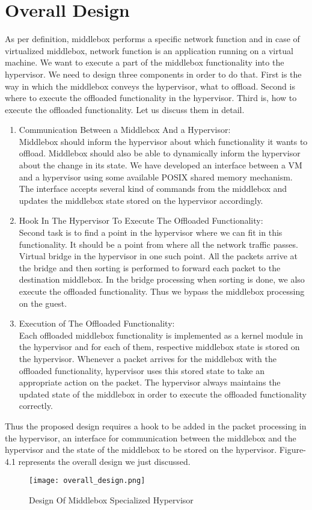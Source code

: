 \documentclass[a4paper,11pt]{report}
\begin{document}
\section{Overall Design}
As per definition, middlebox performs a specific network function and in case of virtualized middlebox, network function is an application running on a virtual machine. We want to execute a part of the middlebox functionality into the hypervisor. We need to design three components in order to do that. First is the way in which the middlebox conveys the hypervisor, what to offload. Second is where to execute the offloaded functionality in the hypervisor. Third is, how to execute the offloaded functionality. Let us discuss them in detail.   
\begin{enumerate}      
\item Communication Between a Middlebox And a Hypervisor: \\ 
Middlebox should inform the hypervisor about which functionality it wants to offload. Middlebox should also be able to dynamically inform the hypervisor about the change in its state. We have developed an interface between a VM and a hypervisor using some available POSIX shared memory mechanism. The interface accepts several kind of commands from the middlebox and updates the middlebox state stored on the hypervisor accordingly. 

\item Hook In The Hypervisor To Execute The Offloaded Functionality: \\
Second task is to find a point in the hypervisor where we can fit in this functionality. It should be a point from where all the network traffic passes. Virtual bridge in the hypervisor in one such point. All the packets arrive at the bridge and then sorting is performed to forward each packet to the destination middlebox. In the bridge processing when sorting is done, we also execute the offloaded functionality. Thus we bypass the middlebox processing on the guest. 

\item Execution of The Offloaded Functionality: \\ 
Each offloaded middlebox functionality is implemented as a kernel module in the hypervisor and for each of them, respective middlebox state is stored on the hypervisor. Whenever a packet arrives for the middlebox with the offloaded functionality, hypervisor uses this stored state to take an appropriate action on the packet. The hypervisor always maintains the updated state of the middlebox in order to execute the offloaded functionality correctly. 
\end{enumerate}
Thus the proposed design requires a hook to be added in the packet processing in the hypervisor, an interface for communication between the middlebox and the hypervisor and the state of the middlebox to be stored on the hypervisor. Figure-4.1 represents the overall design we just discussed.
\begin{figure}[h]
\centering
\texttt{[image: overall\_design.png]}
\caption{Design Of Middlebox Specialized Hypervisor}
\end{figure}   
            
\end{document}
